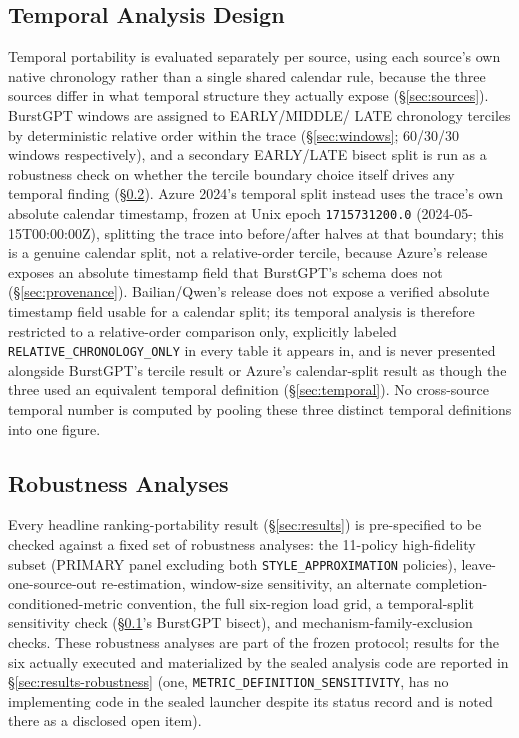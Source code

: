 \documentclass[sn-basic,Numbered,pdflatex]{sn-jnl}
\begin{document}
\subsection{Temporal Analysis Design}
\label{sec:temporal-design}

Temporal portability is evaluated separately per source, using each
source's own native chronology rather than a single shared calendar rule,
because the three sources differ in what temporal structure they actually
expose (\S\ref{sec:sources}). BurstGPT windows are assigned to EARLY/MIDDLE/
LATE chronology terciles by deterministic relative order within the trace
(\S\ref{sec:windows}; 60/30/30 windows respectively), and a secondary
EARLY/LATE bisect split is run as a robustness check on whether the
tercile boundary choice itself drives any temporal finding
(\S\ref{sec:robustness}). Azure 2024's temporal split instead uses the
trace's own absolute calendar timestamp, frozen at Unix epoch
\texttt{1715731200.0} (2024-05-15T00:00:00Z), splitting the trace into
before/after halves at that boundary; this is a genuine calendar split,
not a relative-order tercile, because Azure's release exposes an
absolute timestamp field that BurstGPT's schema does not
(\S\ref{sec:provenance}). Bailian/Qwen's release does not expose a
verified absolute timestamp field usable for a calendar split; its
temporal analysis is therefore restricted to a relative-order
comparison only, explicitly labeled \texttt{RELATIVE\_CHRONOLOGY\_ONLY}
in every table it appears in, and is never presented alongside BurstGPT's
tercile result or Azure's calendar-split result as though the three used
an equivalent temporal definition (\S\ref{sec:temporal}). No cross-source
temporal number is computed by pooling these three distinct temporal
definitions into one figure.

\subsection{Robustness Analyses}
\label{sec:robustness}

Every headline ranking-portability result (\S\ref{sec:results}) is
pre-specified to be checked against a fixed set of robustness analyses: the
11-policy high-fidelity subset (PRIMARY panel excluding both
\texttt{STYLE\_APPROXIMATION} policies), leave-one-source-out re-estimation,
window-size sensitivity, an alternate completion-conditioned-metric
convention, the full six-region load grid, a temporal-split sensitivity
check (\S\ref{sec:temporal-design}'s BurstGPT bisect), and
mechanism-family-exclusion checks. These robustness analyses are part of
the frozen protocol; results for the six actually executed and
materialized by the sealed analysis code are reported in
\S\ref{sec:results-robustness} (one, \texttt{METRIC\_DEFINITION\_SENSITIVITY},
has no implementing code in the sealed launcher despite its status record
and is noted there as a disclosed open item).
\end{document}
